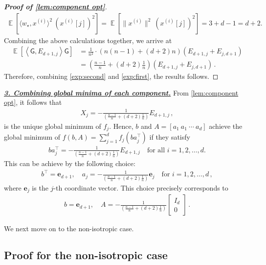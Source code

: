 \documentclass{article}
\DeclareMathOperator{\E}{\mathbb{E}}
\newcommand{\bb}{A}
\newcommand{\bbb}{a}
\newcommand{\cc}{b}
\newcommand{\wstar}{w_\star}
\newcommand{\tx}[1]{x^{(#1)}}
\newcommand{\MM}{\mathsf{G}}
\newcommand{\emphh}[1]{\textbf{\emph{#1}}}
\newcommand{\inp}[2]{\left \langle #1,#2\right\rangle}
\newcommand{\e}{\mathbf{e}}
\begin{document}
\begin{proof}[{\bf Proof of \autoref{lem:component opt}}]
\begin{align}
\E\left[\langle{\wstar}, \tx{i} \rangle^2 \ ({\tx{i}}[j])^2\right] = \E\left[ \|{\tx{i}}\|^2 \  ({\tx{i}}[j])^2 \right] = 3 +d-1 = d+2.
\end{align} 
Combining the above calculations together, we arrive at
\begin{align}
\E \left[ \inp{\MM}{E_{d+1,j}}  \MM \right]  &=   \frac{1}{n^2} \cdot \left( n(n-1) +  (d+2) n \right)  (E_{d+1,j} + E_{j,d+1})\\
&=    \left( \frac{n-1}{n} +  (d+2) \frac{1}{n} \right)    (E_{d+1,j} + E_{j,d+1})\,. \label{exp:first}
\end{align}
Therefore, combining \eqref{exp:second} and \eqref{exp:first}, the results follows. 
\end{proof}




\underline{\emphh{3. Combining global minima of each component.}} 
From \autoref{lem:component opt}, it follows that 
\begin{align}  
X_j = - \frac{1}{\left( \frac{n-1}{n} +  (d+2) \frac{1}{n} \right)}E_{d+1,j}\,,
\end{align} 
is the unique global minimum of $f_j$.
Hence, $\cc$ and $\bb = [\bbb_1\ \bbb_1 \ \cdots \ \bbb_d ]$ achieve the global minimum of $f(\cc,\bb)=\sum_{j=1}^d f_j(\cc \bbb_j^\top)$ if they satisfy
\begin{align}
\cc\bbb_j^\top =  - \frac{1}{\left( \frac{n-1}{n} +  (d+2) \frac{1}{n} \right)}E_{d+1,j} \quad \text{for all }i=1,2,\dots,d. 
\end{align}
This can be achieve by the following choice:
\begin{align}  
\cc^\top = \e_{d+1}  ,\quad \bbb_j =     -  \frac{1}{\left( \frac{n-1}{n} +  (d+2) \frac{1}{n} \right)} \e_j \quad \text{for }i=1,2,\dots,d\,,
\end{align} 
where $\e_j$ is the $j$-th coordinate vector. This choice precisely corresponds to 
\begin{align}
\cc = \e_{d+1},\quad \bb = - \frac{1}{\left( \frac{n-1}{n} +  (d+2) \frac{1}{n} \right)}  \begin{bmatrix}I_d  \\ 0 \end{bmatrix}\,.
\end{align}

We next move on to the non-isotropic case.


\subsection{Proof for the non-isotropic case}
\end{document}
